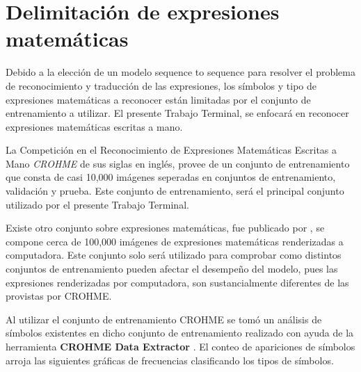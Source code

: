 \newpage
\section{Delimitación de expresiones matemáticas}
\label{sec:del_exp}
Debido a la elección de un modelo sequence to sequence para resolver el problema de reconocimiento y traducción de las expresiones, los símbolos y tipo de expresiones matemáticas a reconocer están limitadas por el conjunto de entrenamiento a utilizar. El presente Trabajo Terminal, se enfocará en reconocer expresiones matemáticas escritas a mano.

La Competición en el Reconocimiento de Expresiones Matemáticas Escritas a Mano \textit{CROHME} de sus siglas en inglés, provee de un conjunto de entrenamiento que consta de casi 10,000 imágenes seperadas en conjuntos de entrenamiento, validación y prueba. Este conjunto de entrenamiento, será el principal conjunto utilizado por el presente Trabajo Terminal.

Existe otro conjunto sobre expresiones matemáticas, fue publicado por \cite{harvard}, se compone cerca de 100,000 imágenes de expresiones matemáticas renderizadas a computadora. Este conjunto solo será utilizado para comprobar como distintos conjuntos de entrenamiento pueden afectar el desempeño del modelo, pues las expresiones renderizadas por computadora, son sustancialmente diferentes de las provistas por CROHME.

Al utilizar el conjunto de entrenamiento CROHME \cite{CROHME} se tomó un análisis de símbolos existentes en dicho conjunto de entrenamiento realizado con ayuda de la herramienta \textbf{CROHME Data Extractor} \cite{EXTRACTOR}. El conteo de apariciones de símbolos arroja las siguientes gráficas de frecuencias clasificando los tipos de símbolos.\\

